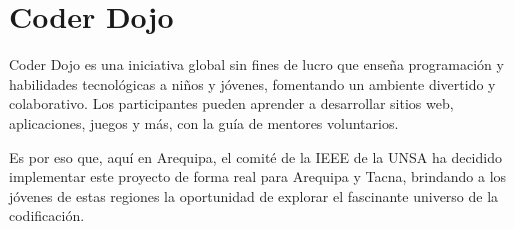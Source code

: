 \documentclass{article}
\begin{document}
\tableofcontents
\pagebreak


\section{Coder Dojo}
Coder Dojo es una iniciativa global sin fines de lucro que enseña programación y habilidades tecnológicas a niños y jóvenes, fomentando un ambiente divertido y colaborativo. Los participantes pueden aprender a desarrollar sitios web, aplicaciones, juegos y más, con la guía de mentores voluntarios.

Es por eso que, aquí en Arequipa, el comité de la IEEE de la UNSA ha decidido implementar este proyecto de forma real para Arequipa y Tacna, brindando a los jóvenes de estas regiones la oportunidad de explorar el fascinante universo de la codificación.
\end{document}
